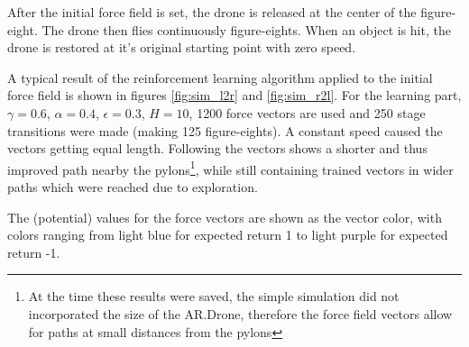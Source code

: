 \documentclass[11pt]{article}
\begin{document}
After the initial force field is set, the drone is released at the center of the figure-eight. The drone then flies continuously figure-eights. When an object is hit, the drone is restored at it's original starting point with zero speed.

A typical result of the reinforcement learning algorithm applied to the initial force field is shown in figures \ref{fig:sim_l2r} and \ref{fig:sim_r2l}. For the learning part, $\gamma = 0.6$, $\alpha = 0.4$, $\epsilon = 0.3$, $H = 10$, 1200 force vectors are used and 250 stage transitions were made (making 125 figure-eights). A constant speed caused the vectors getting equal length. Following the vectors shows a shorter and thus improved path nearby the pylons\footnote{At the time these results were saved, the simple simulation did not incorporated the size of the AR.Drone, therefore the force field vectors allow for paths at small distances from the pylons}, while still containing trained vectors in wider paths which were reached due to exploration.

The (potential) values for the force vectors are shown as the vector color, with colors ranging from light blue for expected return 1 to light purple for expected return -1.
\end{document}
